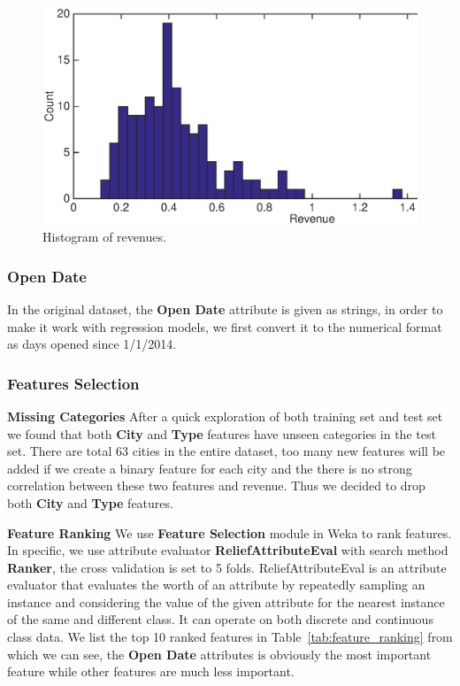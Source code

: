 \documentclass[10pt, oneside]{article}   	%
\newcommand\tabref{Table~\ref}
\begin{document}
\begin{figure}[htbp] %
   \centering
   \includegraphics[width=5.5in]{figs/revenue.eps} 
   \caption{Histogram of revenues.}
   \label{fig:revenue}
\end{figure}

\subsubsection{Open Date}
In the original dataset, the {\bf Open Date} attribute is given as strings, in order to make it work with regression models, we first convert it to the numerical format as days opened since 1/1/2014.

\subsubsection{Features Selection}

{\bf Missing Categories} 
After a quick exploration of both training set and test set we found that both {\bf City} and {\bf Type} features have unseen categories in the test set.
There are total 63 cities in the entire dataset, too many new features will be added if we create a binary feature for each city and 
the there is no strong correlation between these two features and revenue.
Thus we decided to drop both {\bf City} and {\bf Type} features.

{\bf Feature Ranking}
We use \textbf{Feature Selection} module in Weka to rank features. In specific, we use attribute evaluator \textbf{ReliefAttributeEval} with search method \textbf{Ranker}, the cross validation is set to 5 folds. ReliefAttributeEval is an attribute evaluator that evaluates the worth of an attribute by repeatedly sampling an instance and considering the value of the given attribute for the nearest instance of the same and different class. It can operate on both discrete and continuous class data. 
We list the top 10 ranked features in \tabref{tab:feature_ranking} from which we can see, the {\bf Open Date} attributes is obviously the most important feature while other features are much less important.
\end{document}

